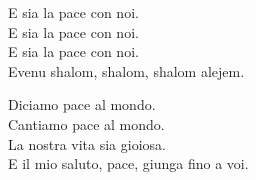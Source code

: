 

\spazio

\strofa E sia la pace con noi.\\
E sia la pace con noi.\\
E sia la pace con noi.\\
Evenu shalom, shalom, shalom alejem.

\spazio


\spazio

\strofa Diciamo pace al mondo.\\
Cantiamo pace al mondo.\\
La nostra vita sia gioiosa.\\
E il mio saluto, pace, giunga fino a voi.

\spazio

